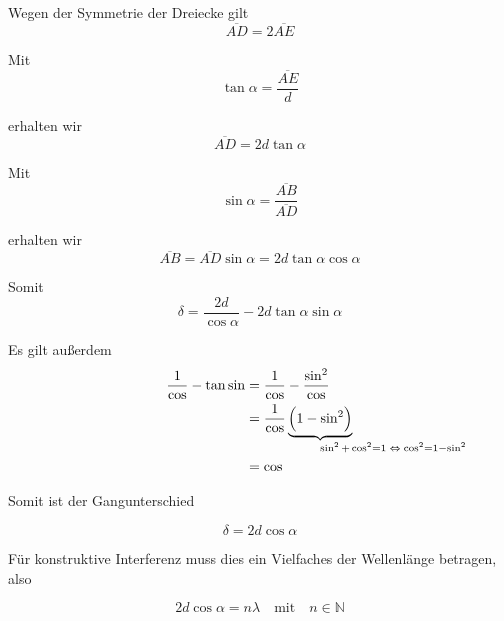 \documentclass[a4paper,german,12pt,smallheadings]{scrartcl}
\begin{document}
Wegen der Symmetrie der Dreiecke gilt
\begin{equation}
  \overline{AD} = 2 \overline{AE}
\end{equation}

Mit
\begin{equation}
  \tan \alpha = \frac{\overline{AE}}{d}
\end{equation}

erhalten wir
\begin{equation}
  \overline{AD} = 2 d \tan \alpha
\end{equation}

Mit
\begin{equation}
  \sin \alpha = \frac{\overline{AB}}{\overline{AD}}
\end{equation}

erhalten wir
\begin{equation}
  \overline{AB} = \overline{AD} \sin \alpha = 2d \tan \alpha \cos \alpha
\end{equation}

Somit
\begin{equation}
  \delta = \frac{2d}{\cos \alpha} - 2d \tan \alpha \sin \alpha
\end{equation}

Es gilt außerdem
\begin{align*}
  \frac{1}{\cos} - \tan \sin &= \frac{1}{\cos} - \frac{\sin^2}{\cos} \\
                             &= \frac{1}{\cos} \underbrace{\del{1-\sin^2}}_{\mathrlap{\sin^2 + \cos^2 = 1 \; \Leftrightarrow \; \cos^2 = 1 - \sin^2}} \\
                             &= \cos
\end{align*}

Somit ist der Gangunterschied

\begin{equation}
  \delta = 2d \cos \alpha
\end{equation}

Für konstruktive Interferenz muss dies ein Vielfaches der Wellenlänge betragen,
also

\begin{equation}
  2d \cos \alpha = n \lambda \quad \text{mit} \quad n \in \mathbb{N}
\end{equation}
\end{document}
